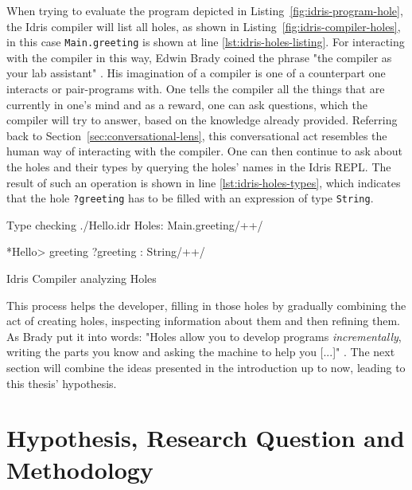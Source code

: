 When trying to evaluate the program depicted in Listing~\ref{fig:idris-program-hole}, the Idris compiler will list all holes, as shown in Listing~\ref{fig:idris-compiler-holes}, in this case \texttt{Main.greeting} is shown at line \ref{lst:idris-holes-listing}.
For interacting with the compiler in this way, Edwin Brady coined the phrase "the compiler as your lab assistant" \cite{brady_type-driven_2017}.
His imagination of a compiler is one of a counterpart one interacts or pair-programs with.
One tells the compiler all the things that are currently in one's mind and as a reward, one can ask questions, which the compiler will try to answer, based on the knowledge already provided.
Referring back to Section~\ref{sec:conversational-lens}, this conversational act resembles the human way of interacting with the compiler.
One can then continue to ask about the holes and their types by querying the holes' names in the Idris REPL.
The result of such an operation is shown in line \ref{lst:idris-holes-types}, which indicates that the hole \texttt{?greeting} has to be filled with an expression of type \texttt{String}.

\begin{program}
\begin{GenericCode}[numbers=none]
Type checking ./Hello.idr
Holes: Main.greeting/+\label{lst:idris-holes-listing}+/

*Hello> greeting
?greeting : String/+\label{lst:idris-holes-types}+/
\end{GenericCode}
\caption{Idris Compiler analyzing Holes}
\label{fig:idris-compiler-holes}
\end{program}

This process helps the developer, filling in those holes by gradually combining the act of creating holes, inspecting information about them and then refining them.
As Brady put it into words: "Holes allow you to develop programs \emph{incrementally}, writing the parts you know and asking the machine to help you [...]" \cite[pp. 21]{brady_type-driven_2017}.
The next section will combine the ideas presented in the introduction up to now, leading to this thesis' hypothesis.

\section{Hypothesis, Research Question and Methodology}
\label{sec:hypothesis}


